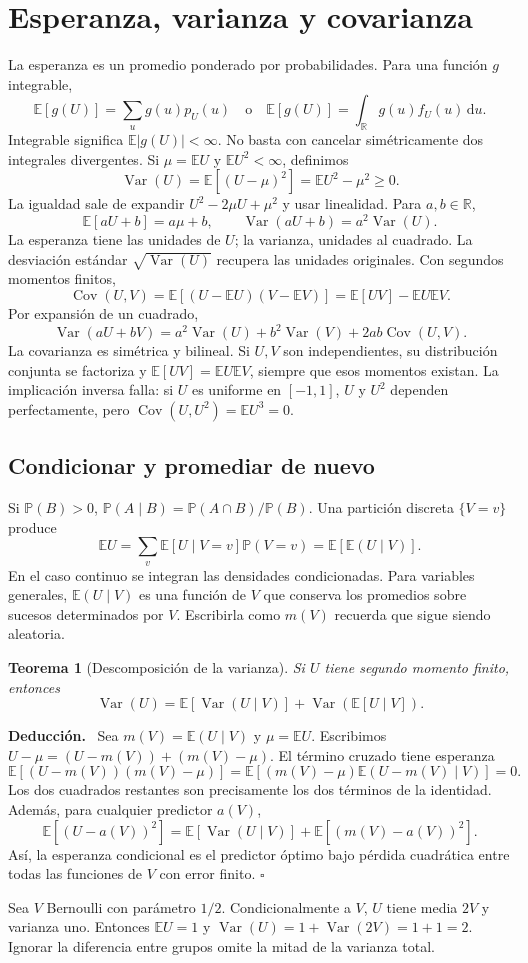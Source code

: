 \documentclass[11pt,a4paper]{article}
\newcommand{\R}{\mathbb R}
\newcommand{\E}{\mathbb E}
\newcommand{\Prob}{\mathbb P}
\newcommand{\dd}{\,\mathrm d}
\DeclareMathOperator{\Var}{Var}
\DeclareMathOperator{\Cov}{Cov}
\newenvironment{deduccion}{\par\textbf{Deducción.}\ }{\hfill$\square$\par}
\newtheorem{teorema}{Teorema}[section]
\theoremstyle{definition}
\begin{document}
\section{Esperanza, varianza y covarianza}
La esperanza es un promedio ponderado por probabilidades. Para una función $g$ integrable,
\[
\E[g(U)]=\sum_u g(u)p_U(u)\quad\text{o}\quad
\E[g(U)]=\int_\R g(u)f_U(u)\dd u.
\]
Integrable significa $\E|g(U)|<\infty$. No basta con cancelar simétricamente dos integrales divergentes. Si $\mu=\E U$ y $\E U^2<\infty$, definimos
\[
\Var(U)=\E[(U-\mu)^2]=\E U^2-\mu^2\ge0.
\]
La igualdad sale de expandir $U^2-2\mu U+\mu^2$ y usar linealidad. Para $a,b\in\R$,
\[
\E[aU+b]=a\mu+b,\qquad\Var(aU+b)=a^2\Var(U).
\]
La esperanza tiene las unidades de $U$; la varianza, unidades al cuadrado. La desviación estándar $\sqrt{\Var(U)}$ recupera las unidades originales. Con segundos momentos finitos,
\[
\Cov(U,V)=\E[(U-\E U)(V-\E V)]=\E[UV]-\E U\E V.
\]
Por expansión de un cuadrado,
\[
\Var(aU+bV)=a^2\Var(U)+b^2\Var(V)+2ab\Cov(U,V).
\]
La covarianza es simétrica y bilineal. Si $U,V$ son independientes, su distribución conjunta se factoriza y $\E[UV]=\E U\E V$, siempre que esos momentos existan. La implicación inversa falla: si $U$ es uniforme en $[-1,1]$, $U$ y $U^2$ dependen perfectamente, pero $\Cov(U,U^2)=\E U^3=0$.
\subsection{Condicionar y promediar de nuevo}
Si $\Prob(B)>0$, $\Prob(A\mid B)=\Prob(A\cap B)/\Prob(B)$. Una partición discreta $\{V=v\}$ produce
\[
\E U=\sum_v\E[U\mid V=v]\Prob(V=v)=\E[\E(U\mid V)].
\]
En el caso continuo se integran las densidades condicionadas. Para variables generales, $\E(U\mid V)$ es una función de $V$ que conserva los promedios sobre sucesos determinados por $V$. Escribirla como $m(V)$ recuerda que sigue siendo aleatoria.
\begin{teorema}[Descomposición de la varianza]
Si $U$ tiene segundo momento finito, entonces
\[
\boxed{\Var(U)=\E[\Var(U\mid V)]+\Var(\E[U\mid V])}.
\]
\end{teorema}
\begin{deduccion}
Sea $m(V)=\E(U\mid V)$ y $\mu=\E U$. Escribimos $U-\mu=(U-m(V))+(m(V)-\mu)$. El término cruzado tiene esperanza
\[
\E[(U-m(V))(m(V)-\mu)]
=\E[(m(V)-\mu)\E(U-m(V)\mid V)]=0.
\]
Los dos cuadrados restantes son precisamente los dos términos de la identidad. Además, para cualquier predictor $a(V)$,
\[
\E[(U-a(V))^2]=\E[\Var(U\mid V)]+\E[(m(V)-a(V))^2].
\]
Así, la esperanza condicional es el predictor óptimo bajo pérdida cuadrática entre todas las funciones de $V$ con error finito.
\end{deduccion}
\begin{ejemplo}
Sea $V$ Bernoulli con parámetro $1/2$. Condicionalmente a $V$, $U$ tiene media $2V$ y varianza uno. Entonces $\E U=1$ y $\Var(U)=1+\Var(2V)=1+1=2$. Ignorar la diferencia entre grupos omite la mitad de la varianza total.
\end{ejemplo}
\end{document}
